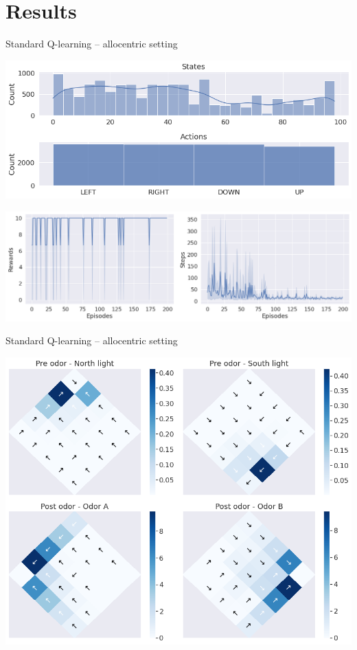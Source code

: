 \documentclass[bigger]{beamer}
\begin{document}
\section{Results}
\label{sec:orgd000ac6}
\begin{frame}[label={sec:org2692541}]{Standard Q-learning -- allocentric setting}
\begin{center}
\includegraphics[height=0.4\textheight]{img/q-learning_allo_hist.png}
\end{center}
\begin{center}
\includegraphics[height=0.4\textheight]{img/q-learning_allo_steps_rewards.png}
\end{center}
\end{frame}
\begin{frame}[label={sec:org3329dc8}]{Standard Q-learning -- allocentric setting}
\begin{center}
\includegraphics[width=.9\linewidth]{img/q-learning_allo_best_actions_maps.png}
\end{center}
\end{frame}
\end{document}
